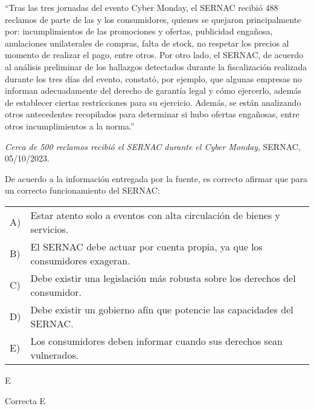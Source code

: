 \documentclass[letterpaper,11pt]{article}
\newcommand{\anchopregunta}{0.9\textwidth}
\begin{document}
\begin{enumerate}
\begin{minipage}{\anchopregunta}
\item ``Tras las tres jornadas del evento Cyber Monday, el SERNAC recibió 488 reclamos de parte de las y los consumidores, quienes se quejaron principalmente por: incumplimientos de las promociones y ofertas, publicidad engañosa, anulaciones unilaterales de compras, falta de stock, no respetar los precios al momento de realizar el pago, entre otros.
Por otro lado, el SERNAC, de acuerdo al análisis preliminar de los hallazgos detectados durante la fiscalización realizada durante los tres días del evento, constató, por ejemplo, que algunas empresas no informan adecuadamente del derecho de garantía legal y cómo ejercerlo, además de establecer ciertas restricciones para su ejercicio. Además, se están analizando otros antecedentes recopilados para determinar si hubo ofertas engañosas, entre otros incumplimientos a la norma.''\\
\begin{flushright}
\textit{Cerca de 500 reclamos recibió el SERNAC durante el Cyber Monday}, SERNAC, 05/10/2023.
\end{flushright}
De acuerdo a la información entregada por la fuente, es correcto afirmar que para un correcto funcionamiento del SERNAC:
\begin{flushleft}\begin{tabular}{@{\hspace{-.001\textwidth}}l@{\hspace{2pt}}p{}}
A)& Estar atento solo a eventos con alta circulación de bienes y servicios.\\
B)& El SERNAC debe actuar por cuenta propia, ya que los consumidores exageran.\\
C)& Debe existir una legislación más robusta sobre los derechos del consumidor.\\
D)& Debe existir un gobierno afín que potencie las capacidades del SERNAC.\\
E)& Los consumidores deben informar cuando sus derechos sean vulnerados.\\ 
\end{tabular}\end{flushleft}%
\begin{key} E
\end{key} 
\begin{hint}
\end{hint}
\begin{answer} Correcta E \\

\end{answer}
\end{minipage}
\end{enumerate}
\end{document}
